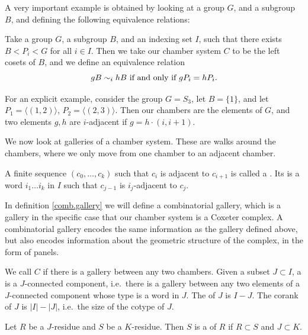 \documentclass[11pt]{article}
\begin{document}
A very important example is obtained by looking at a group $G$, and a subgroup $B$, and defining the following equivalence relations: 

\begin{example}\label{S3}
    Take a group $G$, a subgroup $B$, and an indexing set $I$, such that there exists $B<P_i<G$ for all $i\in I$. Then we take our chamber system $C$ to be the left cosets of $B$, and we define an equivalence relation
    \[gB\sim_{i}hB \textnormal{ if and only if }gP_i=hP_i.\]

    For an explicit example, consider the group $G=S_3$, let $B=\{1\}$, and let $P_1=\langle (1,2)\rangle$, $P_2=\langle (2,3)\rangle$. Then our chambers are the elements of $G$, and two elements $g,h$ are $i$-adjacent if $g=h\cdot(i,i+1)$. 
\end{example}

We now look at galleries of a chamber system. These are walks around the chambers, where we only move from one chamber to an adjacent chamber. 

\begin{definition}\label{gallery}
    A finite sequence $(c_0,\hdots ,c_k)$ such that $c_i$ is adjacent to $c_{i+1}$ is called a . Its  is a word $i_1\hdots i_k$ in $I$ such that  $c_{j-1}$ is $i_j$-adjacent to $c_{j}$. 
\end{definition}

In definition \ref{comb.gallery} we will define a combinatorial gallery, which is a gallery in the specific case that our chamber system is a Coxeter complex. A combinatorial gallery encodes the same information as the gallery defined above, but also encodes information about the geometric structure of the complex, in the form of panels. 

\begin{definition}\label{residue}
    We call $C$  if there is a gallery between any two chambers. Given a subset $J\subset I$, a  is a $J$-connected component, i.e.\ there is a gallery between any two elements of a $J$-connected component whose type is a word in $J$. The  of $J$ is $I-J$. The corank of $J$ is $|I|-|J|$, i.e.\ the size of the cotype of $J$. 
\end{definition}
\begin{definition}
    Let $R$ be a $J$-residue and $S$ be a $K$-residue. Then $S$ is a  of $R$ if $R\subset S$ and $J\subset K$. 
\end{definition}
\end{document}
